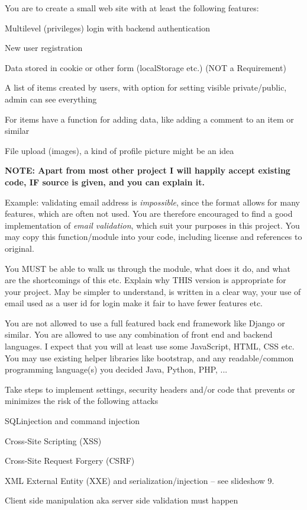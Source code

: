 \documentclass[a4paper,11pt,notitlepage]{report}
\begin{document}
You are to create a small web site with at least the following features:

\begin{list2}
\item Multilevel (privileges) login with backend authentication
\item New user registration
\item Data stored in cookie or other form (localStorage etc.) (NOT a Requirement)
\item A list of items created by users, with option for setting visible private/public, admin can see everything
\item For items have a function for adding data, like adding a comment to an item or similar
\item File upload (images), a kind of profile picture might be an idea
\end{list2}

{\bf NOTE: Apart from most other project I will happily accept existing code, IF source is given, and you can explain it.}

Example: validating email address is \emph{impossible}, since the format allows for many features, which are often not used. You are therefore encouraged to find a good implementation of \emph{email validation}, which suit your purposes in this project. You may copy this function/module into your code, including license and references to original.

You MUST be able to walk us through the module, what does it do, and what are the shortcomings of this etc. Explain why THIS version is appropriate for your project. May be simpler to understand, is written in a clear way, your use of email used as a user id for login make it fair to have fewer features etc.

You are not allowed to use a full featured back end framework like Django or similar. You are allowed to use any combination of front end and backend languages. I expect that you will at least use some JavaScript, HTML, CSS etc. You may use existing helper libraries like bootstrap, and any readable/common programming language(s) you decided Java, Python, PHP, ...

Take steps to implement settings, security headers and/or code that prevents or minimizes the risk of
the following attacks

\begin{list2}
\item SQLinjection and command injection
\item Cross-Site Scripting (XSS)
\item Cross-Site Request Forgery (CSRF)
\item XML External Entity (XXE) and serialization/injection -- see slideshow 9.
\item Client side manipulation aka server side validation must happen
\end{list2}
\end{document}

